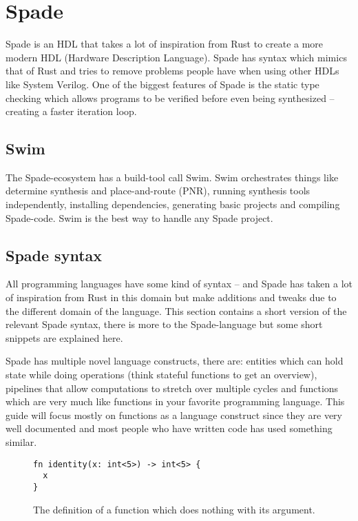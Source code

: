 \section{Spade}
Spade is an HDL that takes a lot of inspiration from Rust to create a more modern HDL (Hardware Description Language). Spade has syntax which mimics that of Rust and tries to remove problems people have when using other HDLs like System Verilog. One of the biggest features of Spade is the static type checking which allows programs to be verified before even being synthesized -- creating a faster iteration loop.
\cite{src:spadeSomething,src:spadeAnHDL}

\subsection{Swim}
The Spade-ecosystem has a build-tool call Swim. Swim orchestrates things like determine synthesis and place-and-route (PNR), running synthesis tools independently, installing dependencies, generating basic projects and compiling Spade-code. Swim is the best way to handle any Spade project.

\subsection{Spade syntax}
All programming languages have some kind of syntax -- and Spade has taken a lot of inspiration from Rust in this domain but make additions and tweaks due to the different domain of the language. This section contains a short version of the relevant Spade syntax, there is more to the Spade-language but some short snippets are explained here.

Spade has multiple novel language constructs, there are: entities which can hold state while doing operations (think stateful functions to get an overview), pipelines that allow computations to stretch over multiple cycles and functions which are very much like functions in your favorite programming language. This guide will focus mostly on functions as a language construct since they are very well documented and most people who have written code has used something similar.

\begin{figure}[h!]
\begin{verbatim}
fn identity(x: int<5>) -> int<5> {
  x
}
\end{verbatim}
  \caption{The definition of a function which does nothing with its argument.}
  \label{fig:SpadeExample1}
\end{figure}

